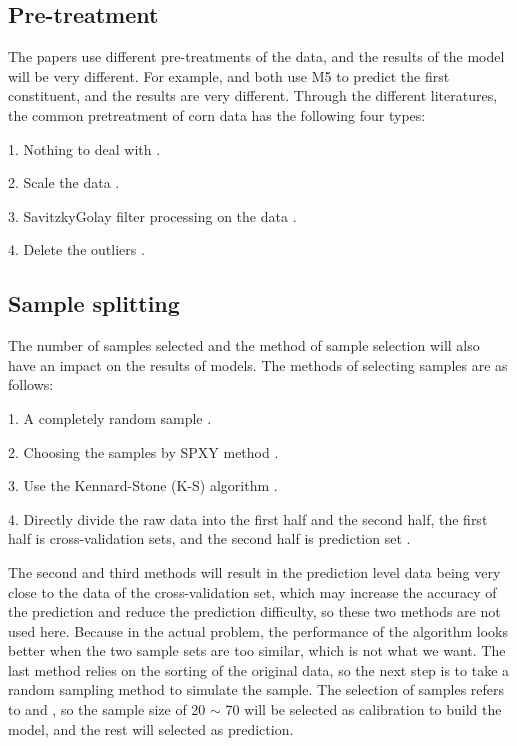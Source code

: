 \documentclass[a4paper,12pt,titlepage]{article} %
\numberwithin{equation}{section}  %
\begin{document}
	\subsection{Pre-treatment}
	\label{sec:treat}
	The papers use different pre-treatments of the data, and the results of the model will be very different. For example, \citet{7galvao2008variable} and \citet{8ji2015using} both use M5 to predict the first constituent, and the results are very different. Through the different literatures, the common pretreatment of corn data has the following four types:
	
	1. Nothing to deal with \citep{1su2006partial}.
	
	2. Scale the data \citep{4ergon2006reduced}.
	
	3. SavitzkyGolay filter processing on the data \citep{3galvao2007cross}.
	
	4. Delete the outliers \citep{8ji2015using}.
	
	\subsection{Sample splitting}
	\label{splitting}
	The number of samples selected and the method of sample selection will also have an impact on the results of models. The methods of selecting samples are as follows:
	
	1. A completely random sample \citep{1su2006partial}.
	
	2. Choosing the samples by SPXY method \citep{3galvao2007cross}.
	
	3. Use the Kennard-Stone (K-S) algorithm \citep{zhao2015optimization}.
	
	4. Directly divide the raw data into the first half and the second half, the first half is cross-validation sets, and the second half is prediction set \citep{4ergon2006reduced}.
	
	The second and third methods will result in the prediction level data being very close to the data of the cross-validation set, which may increase the accuracy of the prediction and reduce the prediction difficulty, so these two methods are not used here. Because in the actual problem, the performance of the algorithm looks better when the two sample sets are too similar, which is not what we want. The last method relies on the sorting of the original data, so the next step is to take a random sampling method to simulate the sample. The selection of samples refers to \citet{5zheng2012stability} and \citet{6zheng2015pretreating}, so the sample size of 20 $\sim$ 70 will be selected as calibration to build the model, and the rest will selected as prediction.
	
\end{document}
